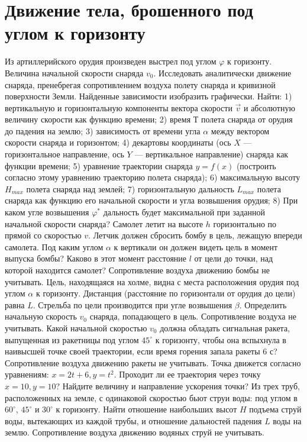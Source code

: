 \section{Движение тела, брошенного под углом к горизонту}
\AddProb	 Из артиллерийского орудия произведен выстрел под углом $\varphi$ к горизонту. Величина начальной скорости снаряда $v_0$. Исследовать аналитически движение снаряда, пренебрегая сопротивлением воздуха полету снаряда и кривизной поверхности Земли. Найденные зависимости изобразить графически. Найти: 1) вертикальную и горизонтальную компоненты вектора скорости $\vec{v}$ и абсолютную величину скорости как функцию времени; 2) время $Т$ полета снаряда от орудия до падения на землю; 3) зависимость от времени угла $\alpha$ между вектором скорости снаряда и горизонтом; 4) декартовы координаты (ось $X$ — горизонтальное направление, ось $Y$ — вертикальное направление) снаряда как функции времени; 5) уравнение траектории снаряда $y = f(x)$ (построить согласно этому уравнению траекторию полета снаряда); 6) максимальную высоту $H_{max}$ полета снаряда над землей; 7) горизонтальную дальность $L_{max}$ полета снаряда как функцию его начальной скорости и угла возвышения орудия; 8) При каком угле возвышения $\varphi^*$ дальность будет максимальной при заданной начальной скорости снаряда?
\AddProb Самолет летит на высоте $h$ горизонтально по прямой со скоростью $v$. Летчик должен сбросить бомбу в цель, лежащую впереди самолета. Под каким углом $\alpha$ к вертикали он должен видеть цель в момент выпуска бомбы? Каково в этот момент расстояние $l$ от цели до точки, над которой находится самолет? Сопротивление воздуха движению бомбы не учитывать.
\AddProb Цель, находящаяся на холме, видна с места расположения орудия под углом $\alpha$ к горизонту. Дистанция (расстояние по горизонтали от орудия до цели) равна $L$. Стрельба по цели производится при угле возвышения $\beta$. Определить начальную скорость $v_0$ снаряда, попадающего в цель. Сопротивление воздуха не учитывать.
\AddProb Какой начальной скоростью $v_0$ должна обладать сигнальная ракета, выпущенная из ракетницы под углом $45^{\circ}$ к горизонту, чтобы она вспыхнула в наивысшей точке своей траектории, если время горения запала ракеты 6 с? Сопротивление воздуха движению ракеты не учитывать.
\AddProb Точка движется согласно уравнениям: $x = 2t + 6, y = t^2$. Проходит ли ее траектория через точку $x = 10, y = 10$? Найдите величину и направление ускорения точки?
\AddProb Из трех труб, расположенных на земле, с одинаковой скоростью бьют струи воды: под углом в $60^{\circ}$, $45^{\circ}$ и $30^{\circ}$ к горизонту. Найти отношение наибольших высот $H$ подъема струй воды, вытекающих из каждой трубы, и отношение дальностей падения $L$ воды на землю. Сопротивление воздуха движению водяных струй не учитывать.
